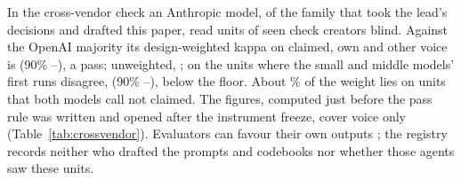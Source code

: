 In the cross-vendor check an Anthropic model, of the family that took the lead's decisions and drafted this paper,
read \VtrUnits{} units of \VtrCreators{} seen check creators blind. Against the OpenAI majority its design-weighted
kappa on claimed, own and other voice is \VtrKappa{} (90\% \VtrKappaLo--\VtrKappaHi), a pass; unweighted,
\VtrKappaUnweighted; on the \VtrDisagreeUnits{} units where the small and middle models' first runs disagree,
\VtrDisagreeKappa{} (90\% \VtrDisagreeKappaLo--\VtrDisagreeKappaHi), below the floor. About \VtrHeavySharePct\% of the
weight lies on \VtrHeavyUnits{} units that both models call not claimed. The figures, computed just before the pass
rule was written and opened after the instrument freeze, cover voice only (Table~\ref{tab:crossvendor}). Evaluators
can favour their own outputs \cite{panickssery2024evaluators}; the registry records neither who drafted the prompts and
codebooks nor whether those agents saw these units.
